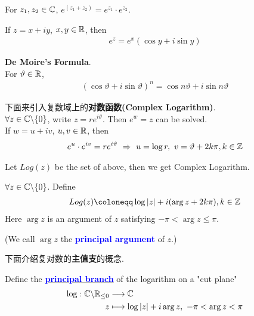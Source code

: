 \vspace{2em}
\begin{proposition}\label{prop 3.1.1}
	For $z_1 , z_2 \in \mathbb{C}$, $e^{(z_1 + z_2)} = e^{z_1} \cdot e^{z_2}$.
\end{proposition}

\vspace{2em}
\begin{corollary}\label{cor 3.1.5}
	If $z = x + iy$, $x , y \in \mathbb{R}$, then
	\begin{align}
		e^z = e^x (\cos{y} + i\sin{y})
	\end{align}
\end{corollary}

\vspace{2em}
\begin{corollary}\label{cor 3.1.6}
	\textbf{De Moire's Formula}.\\
	For $\vartheta \in \mathbb{R}$,
	\begin{align}
		(\cos{\vartheta} + i\sin{\vartheta})^n = \cos{n\vartheta} + i\sin{n\vartheta}
	\end{align}
\end{corollary}

\vspace{2em}
下面来引入复数域上的\textbf{对数函数(Complex Logarithm)}.\\
$\forall z \in \mathbb{C} \backslash \{ 0 \}$, write $z = r e^{i\vartheta}$. Then $e^w = z$ can be solved.\\
If $w = u + iv$, $u , v \in \mathbb{R}$, then
\begin{align}
	e^u \cdot e^{iv} = r e^{i\vartheta} \,\, \Rightarrow \,\, u = \log{r} , \,\, v = \vartheta + 2k\pi , k \in \mathbb{Z}
\end{align}

Let $Log(z)$ be the set of above, then we get Complex Logarithm.

\begin{defn}\label{def 3.1.2}
	$\forall z \in \mathbb{C} \backslash \{ 0 \}$. Define
	\begin{align}
		Log(z) \coloneqq \log{\left| z \right|} + i(\arg{z} + 2k\pi) , k \in \Z
	\end{align}
	Here $\arg{z}$ is an argument of $z$ satisfying $-\pi < \arg{z} \leq \pi$.
	\begin{center}
		(We call $\arg{z}$ the \textcolor{blue}{\textbf{principal argument}} of $z$.) 
	\end{center}
\end{defn}

\newpage
下面介绍复对数的\textbf{主值支}的概念.
\begin{defn}\label{def 3.1.3}
	Define the \underline{\textcolor{blue}{\textbf{principal branch}}} of the logarithm on a "cut plane"
	\begin{align}
		\log : \mathbb{C} \backslash \mathbb{R}_{\leq 0} &\longrightarrow \mathbb{C} \\
		z &\longmapsto \log{\left| z \right|} + i\arg{z} , \,\, -\pi < \arg{z} < \pi
	\end{align}
\end{defn}

